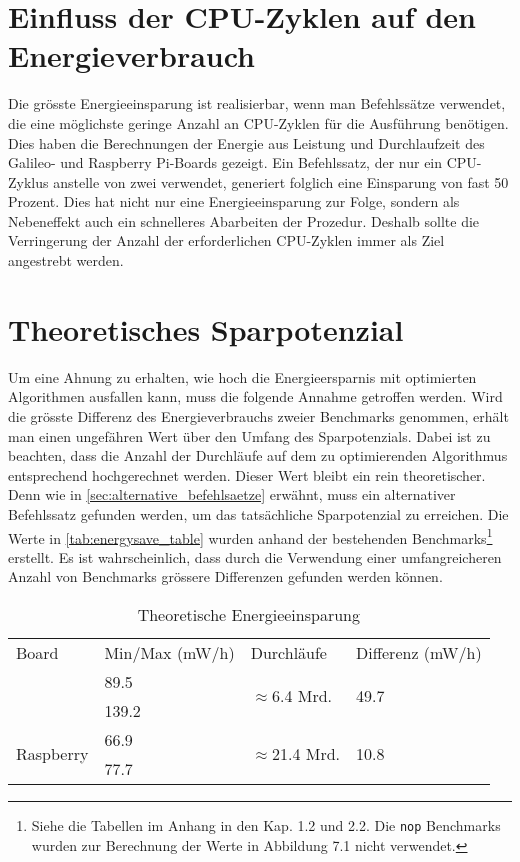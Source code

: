 \section{Einfluss der CPU-Zyklen auf den Energieverbrauch}
Die grösste Energieeinsparung ist realisierbar, wenn man Befehlssätze verwendet, die eine möglichste geringe Anzahl an CPU-Zyklen für die Ausführung benötigen. Dies haben die Berechnungen der Energie aus Leistung und Durchlaufzeit   des Galileo- und Raspberry Pi-Boards gezeigt. Ein Befehlssatz, der nur ein CPU-Zyklus anstelle von zwei verwendet, generiert folglich eine Einsparung von fast 50 Prozent. Dies hat nicht nur eine Energieeinsparung zur Folge, sondern als Nebeneffekt auch ein schnelleres Abarbeiten der Prozedur. Deshalb sollte die Verringerung der Anzahl der erforderlichen CPU-Zyklen immer als Ziel angestrebt werden.

\section{Theoretisches Sparpotenzial}
Um eine Ahnung zu erhalten, wie hoch die Energieersparnis mit optimierten Algorithmen ausfallen kann, muss die folgende Annahme getroffen werden. Wird die grösste Differenz des Energieverbrauchs zweier Benchmarks genommen, erhält man einen ungefähren Wert über den Umfang des Sparpotenzials. Dabei ist zu beachten, dass die Anzahl der Durchläufe auf dem zu optimierenden Algorithmus entsprechend hochgerechnet werden. Dieser Wert bleibt ein rein theoretischer. Denn wie in \autoref{sec:alternative_befehlsaetze} erwähnt, muss ein alternativer Befehlssatz gefunden werden, um das tatsächliche Sparpotenzial zu erreichen. Die Werte in \autoref{tab:energysave_table} wurden anhand der bestehenden Benchmarks\footnote{Siehe die Tabellen im Anhang in den Kap. 1.2 und 2.2. Die \texttt{nop} Benchmarks wurden zur Berechnung der Werte in Abbildung 7.1 nicht verwendet.} erstellt. Es ist wahrscheinlich, dass durch die Verwendung einer umfangreicheren Anzahl von Benchmarks grössere Differenzen gefunden werden können.


\begin{table}[H]
\center
\begin{tabular}{ |l|l|l|l| }
\hline
Board & Min/Max (mW/h) & Durchläufe & Differenz (mW/h) \\ \hhline{|=|=|=|=|}
\multirow{2}{*}{Galileo} & 89.5 & \multirow{2}{*}{$\approx$6.4 Mrd.} & \multirow{2}{*}{49.7} \\ 
 & 139.2 & &  \\ \hline
\multirow{2}{*}{Raspberry} & 66.9 & \multirow{2}{*}{$\approx$21.4 Mrd.} & \multirow{2}{*}{10.8} \\ 
 & 77.7 & &  \\
\hline
\end{tabular}
\caption{Theoretische Energieeinsparung}
\label{tab:energysave_table}
\end{table}


